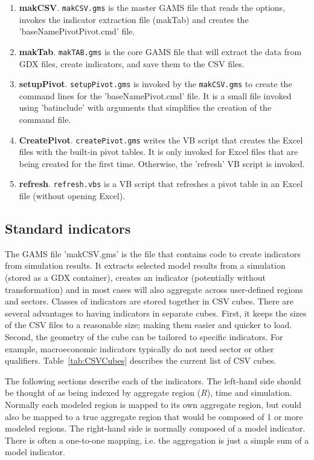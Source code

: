 \begin{enumerate}
\item \textbf{makCSV}. \texttt{makCSV.gms} is the master GAMS file that reads the options, invokes the
indicator extraction file (makTab) and creates the 'baseNamePivotPivot.cmd' file.
\item \textbf{makTab}. \texttt{makTAB.gms} is the core GAMS file that will extract the
data from GDX files, create indicators, and save them to the CSV files.
\item \textbf{setupPivot}. \texttt{setupPivot.gms} is invoked by the \texttt{makCSV.gms} to
create the command lines for the 'baseNamePivot.cmd' file. It is a small file
invoked using 'batinclude' with arguments that simplifies the creation of the command file.
\item \textbf{CreatePivot}. \texttt{createPivot.gms} writes the VB script that creates
the Excel files with the built-in pivot tables. It is only invoked for Excel files
that are being created for the first time. Otherwise, the 'refresh' VB script is invoked.
\item \textbf{refresh}. \texttt{refresh.vbs} is a VB script that refreshes a
pivot table in an Excel file (without opening Excel).
\end{enumerate}

\subsection{Standard indicators}

The GAMS file 'makCSV.gms' is the file that contains code to create indicators from
simulation results. It extracts selected model results from a simulation (stored as a
GDX container), creates an indicator (potentially without transformation) and in
most cases will also aggregate across user-defined regions and sectors. Classes of
indicators are stored together in CSV cubes. There are several advantages to
having indicators in separate cubes. First, it keeps the sizes of the CSV files
to a reasonable size; making them easier and quicker to load. Second, the
geometry of the cube can be tailored to specific indicators. For example, macroeconomic
indicators typically do not need sector or other qualifiers. Table~\ref{tab:CSVCubes} describes
the current list of CSV cubes.

The following sections describe each of the indicators. The left-hand side
should be thought of as being indexed by aggregate region ($R$), time and simulation.
Normally each modeled region is mapped to its own aggregate region, but could also
be mapped to a true aggregate region that would be composed of 1 or more modeled regions.
The right-hand side is normally composed of a model indicator. There is often a one-to-one
mapping, i.e. the aggregation is just a simple sum of a model indicator.

